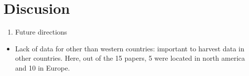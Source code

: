 \documentclass[
  12pt,
  oneside]{report}
\providecommand{\tightlist}{%
  \setlength{\itemsep}{0pt}\setlength{\parskip}{0pt}}
\begin{document}
\hypertarget{discusion}{%
\chapter{Discusion}\label{discusion}}

\begin{enumerate}
\def\labelenumi{\arabic{enumi})}
\setcounter{enumi}{2}
\tightlist
\item
  Future directions
\end{enumerate}

\begin{itemize}
\tightlist
\item
  Lack of data for other than western countries: important to harvest data in other countries. Here, out of the 15 papers, 5 were located in north america and 10 in Europe.
\end{itemize}
\end{document}
